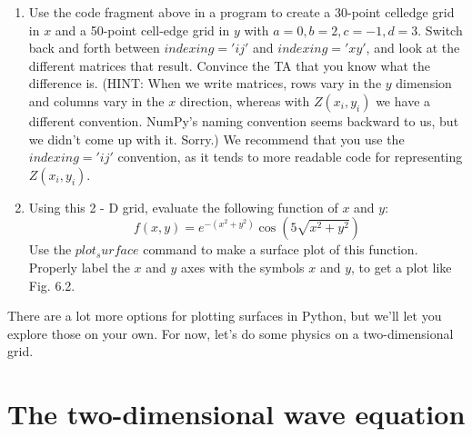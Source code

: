 \begin{problem}\label{P6.1} 

\begin{enumerate}[label=(\alph*)]
\item
Use the code fragment above in a program to create a 30-point celledge grid in $x$ and a 50-point cell-edge grid in $y$ with $a = 0, b = 2,
c = −1, d = 3$. Switch back and forth between $indexing='ij'$ and
$indexing='xy'$, and look at the different matrices that result. Convince the TA that you know what the difference is. (HINT: When
we write matrices, rows vary in the $y$ dimension and columns vary
in the $x$ direction, whereas with $Z(x_i, y_i)$ we have a different convention. NumPy\rq s naming convention seems backward to us, but
we didn\rq t come up with it. Sorry.) We recommend that you use the
$indexing='ij'$ convention, as it tends to more readable code for representing $Z(x_i, y_i)$.
\item  Using this 2 - D grid, evaluate the following function of $x$ and $y$:
\begin{equation}\label{eq:61}
f(x,y) = e^{-(x^2+y^2)} \cos(5\sqrt{x^2+y^2})
\end{equation}
Use the $plot_surface$ command to make a surface plot of this function. Properly label the $x$ and $y$ axes with the symbols $x$ and $y$, to get
a plot like Fig. 6.2.
\end{enumerate}\end{problem}
There are a lot more options for plotting surfaces in Python, but we\rq ll let you
explore those on your own. For now, let\rq s do some physics on a two-dimensional
grid.
\section*{The two-dimensional wave equation}


